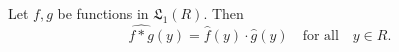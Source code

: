 Let $f, g$ be functions in $\mathfrak{L}_1(R)$. Then
$$\widehat{f * g}(y) = \hat{f}(y) \cdot \hat{g}(y) \quad \text{for all} \quad y \in R.$$
